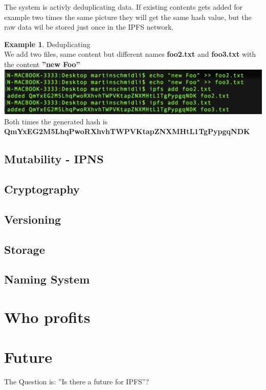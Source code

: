 \documentclass[a4paper,11pt, oneside]{report}
\theoremstyle{definition}
\newtheorem{exmp}{Example}[subsection]
\begin{document}
\noindent
The system is activly deduplicating data. If existing contents gets added for example two times the same picture they will get the same hash value, but the raw data wil be stored just once in the IPFS network.\\ 
\begin{exmp}Deduplicating\\[0.3cm]
	We add two files, same content but different names \textbf{foo2.txt} and \textbf{foo3.txt} with the content \textbf{''new Foo''}\\[0.3cm]
	\includegraphics[width=\textwidth]{img/addFile06.png}\\[0.3cm]
	Both times the generated hash is \\ \textbf{QmYxEG2M5LhqPwoRXhvhTWPVKtapZNXMHtL1TgPypgqNDK}
\end{exmp}

\newpage
\section{Mutability - IPNS}


\newpage

\section{Cryptography}
\section{Versioning}
\section{Storage}
\section{Naming System}

\chapter{Who profits}

\chapter{Future}
The Question is: ''Is there a future for IPFS''?
\end{document}
